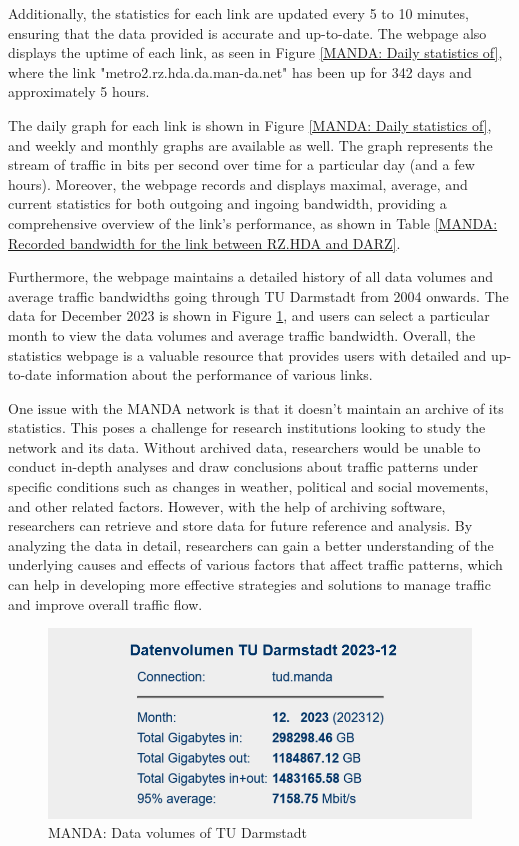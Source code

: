 \documentclass[sigconf,authorversion,nonacm]{acmart}
\begin{document}
Additionally, the statistics for each link are updated every 5 to 10 minutes, ensuring that the data provided is accurate and up-to-date. The webpage also displays the uptime of each link, as seen in Figure \ref{MANDA: Daily statistics of}, where the link "metro2.rz.hda.da.man-da.net" has been up for 342 days and approximately 5 hours. 

The daily graph for each link is shown in Figure \ref{MANDA: Daily statistics of}, and weekly and monthly graphs are available as well. The graph represents the stream of traffic in bits per second over time for a particular day (and a few hours). Moreover, the webpage records and displays maximal, average, and current statistics for both outgoing and ingoing bandwidth, providing a comprehensive overview of the link's performance, as shown in Table \ref{MANDA: Recorded bandwidth for the link between RZ.HDA and DARZ}. 

Furthermore, the webpage maintains a detailed history of all data volumes and average traffic bandwidths going through TU Darmstadt from 2004 onwards. The data for December 2023 is shown in Figure \ref{MANDA: Data volumes of TU Darmstadt}, and users can select a particular month to view the data volumes and average traffic bandwidth. Overall, the statistics webpage is a valuable resource that provides users with detailed and up-to-date information about the performance of various links.

One issue with the MANDA network is that it doesn't maintain an archive of its statistics. This poses a challenge for research institutions looking to study the network and its data. Without archived data, researchers would be unable to conduct in-depth analyses and draw conclusions about traffic patterns under specific conditions such as changes in weather, political and social movements, and other related factors. However, with the help of archiving software, researchers can retrieve and store data for future reference and analysis. By analyzing the data in detail, researchers can gain a better understanding of the underlying causes and effects of various factors that affect traffic patterns, which can help in developing more effective strategies and solutions to manage traffic and improve overall traffic flow.

\begin{figure}
    \centering
    \includegraphics[width=\linewidth]{MANDA/pastedImage.png}
    \caption{MANDA: Data volumes of TU Darmstadt}
    \label{MANDA: Data volumes of TU Darmstadt}
\end{figure}
\end{document}
